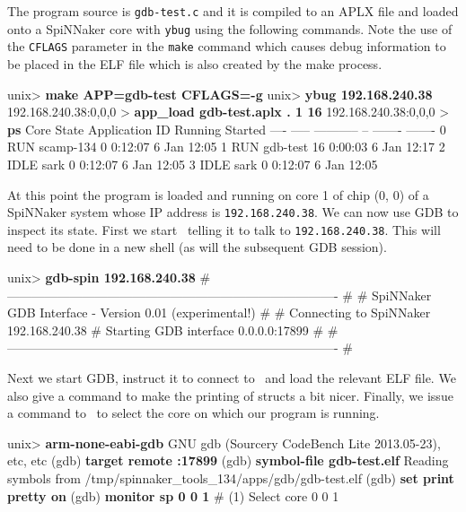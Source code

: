 The program source is \texttt{gdb-test.c} and it is compiled to an APLX
file and loaded onto a SpiNNaker core with \texttt{ybug} using the
following commands. Note the use of the \texttt{CFLAGS} parameter in
the \texttt{make} command which causes debug information to be placed
in the ELF file which is also created by the make process.

\begin{shell}
unix> \textbf{make APP=gdb-test CFLAGS=-g}
unix> \textbf{ybug 192.168.240.38}
192.168.240.38:0,0,0 > \textbf{app_load gdb-test.aplx . 1 16}
192.168.240.38:0,0,0 > \textbf{ps}
Core State  Application       ID   Running  Started
---- -----  -----------       --   -------  -------
  0  RUN    scamp-134          0   0:12:07   6 Jan 12:05
  1  RUN    gdb-test          16   0:00:03   6 Jan 12:17
  2  IDLE   sark               0   0:12:07   6 Jan 12:05
  3  IDLE   sark               0   0:12:07   6 Jan 12:05
\end{shell}

At this point the program is loaded and running on core 1 of chip (0,
0) of a SpiNNaker system whose IP address
is \texttt{192.168.240.38}. We can now use GDB to inspect its state.
First we start \gdbspin\ telling it to talk to \texttt{192.168.240.38}.
This will need to be done in a new shell (as will the subsequent GDB
session).

\begin{shell}
unix> \textbf{gdb-spin 192.168.240.38}
#-------------------------------------------------------------------------------
#
# SpiNNaker GDB Interface - Version 0.01 (experimental!)
#
# Connecting to SpiNNaker   192.168.240.38
# Starting GDB interface    0.0.0.0:17899
#
#-------------------------------------------------------------------------------
#
\end{shell}

Next we start GDB, instruct it to connect to \gdbspin\ and load the
relevant ELF file. We also give a command to make the printing of
structs a bit nicer. Finally, we issue a command to \gdbspin\ to
select the core on which our program is running.

\begin{shell}
unix> \textbf{arm-none-eabi-gdb }
GNU gdb (Sourcery CodeBench Lite 2013.05-23), etc, etc
(gdb) \textbf{target remote :17899}
(gdb) \textbf{symbol-file gdb-test.elf}
Reading symbols from /tmp/spinnaker_tools_134/apps/gdb/gdb-test.elf
(gdb) \textbf{set print pretty on}
(gdb) \textbf{monitor sp 0 0 1}
#  (1) Select core 0 0 1
\end{shell}

